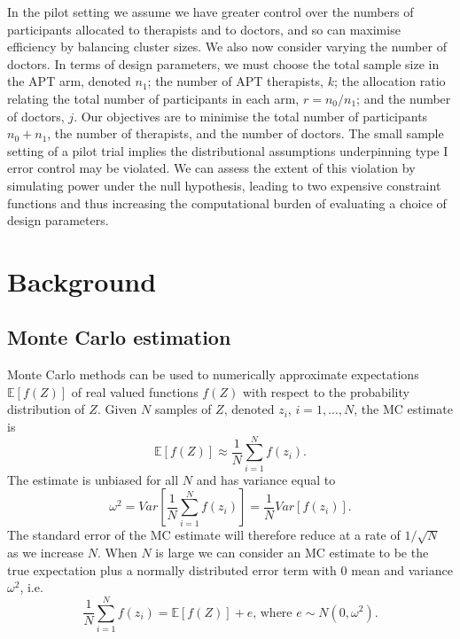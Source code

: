\documentclass{article} %
\begin{document}
In the pilot setting we assume we have greater control over the numbers of participants allocated to therapists and to doctors, and so can maximise efficiency by balancing cluster sizes. We also now consider varying the number of doctors. In terms of design parameters, we must choose the total sample size in the APT arm, denoted $n_1$; the number of APT therapists, $k$; the allocation ratio relating the total number of participants in each arm, $r = n_0/n_1$; and the number of doctors, $j$. Our objectives are to minimise the total number of participants $n_0 + n_1$, the number of therapists, and the number of doctors. The small sample setting of a pilot trial implies the distributional assumptions underpinning type I error control may be violated. We can assess the extent of this violation by simulating power under the null hypothesis, leading to two expensive constraint functions and thus increasing the computational burden of evaluating a choice of design parameters.

\section{Background}\label{sec:prelim}

\subsection{Monte Carlo estimation}\label{sec:MC}

Monte Carlo methods can be used to numerically approximate expectations $\mathbb{E}[f(Z)]$ of real valued functions $f(Z)$ with respect to the probability distribution of $Z$. Given $N$ samples of $Z$, denoted $z_{i}$, $i=1,\ldots,N$, the MC estimate is
\begin{equation}
\mathbb{E}[f(Z)] \approx \frac{1}{N} \sum_{i=1}^{N} f(z_{i}).
\end{equation}
The estimate is unbiased for all $N$ and has variance equal to
\begin{equation}
\omega^{2} = Var \left[ \frac{1}{N} \sum_{i=1}^{N} f(z_{i}) \right] = \frac{1}{N} Var \left[ f(z_{i}) \right].
\end{equation}
The standard error of the MC estimate will therefore reduce at a rate of $1/\sqrt{N}$ as we increase $N$. When $N$ is large we can consider an MC estimate to be the true expectation plus a normally distributed error term with 0 mean and variance $\omega^{2}$, i.e.
\begin{equation}\label{eqn:MC_error}
\frac{1}{N} \sum_{i=1}^{N} f(z_{i}) = \mathbb{E}[f(Z)] + e \text{, where } e \sim N(0, \omega^{2}).
\end{equation}
\end{document}
